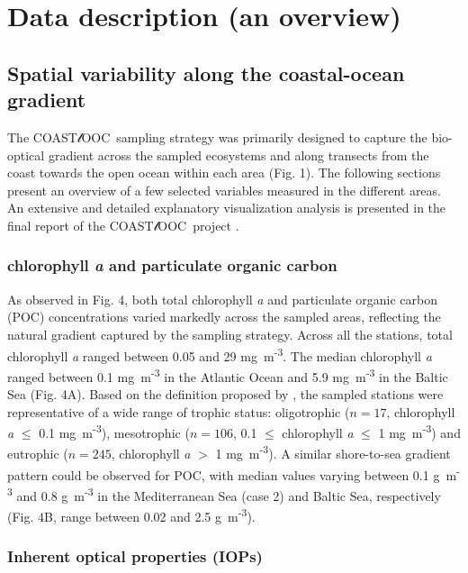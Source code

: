 \documentclass[essd, manuscript]{copernicus}
\newcommand{\coastlooc}{COAST$\mathscr{l}$OOC~\allowbreak}
\begin{document}
\section{Data description (an overview)}

\subsection{Spatial variability along the coastal-ocean gradient}

The \coastlooc sampling strategy was primarily designed to capture the bio-optical gradient across the sampled ecosystems and along transects from the coast towards the open ocean within each area (Fig. 1). The following sections present an overview of a few selected variables measured in the different areas. An extensive and detailed explanatory visualization analysis is presented in the final report of the \coastlooc project \citep{Coastlooc2000}. 

\subsubsection{chlorophyll \textit{a} and particulate organic carbon}

As observed in Fig. 4, both total chlorophyll \textit{a} and particulate organic carbon (POC) concentrations varied markedly across the sampled areas, reflecting the natural gradient captured by the sampling strategy. Across all the stations, total chlorophyll \textit{a} ranged between 0.05 and 29 mg~m\textsuperscript{-3}. The median chlorophyll \textit{a} ranged between 0.1 mg~m\textsuperscript{-3} in the Atlantic Ocean and 5.9 mg~m\textsuperscript{-3} in the Baltic Sea (Fig. 4A). Based on the definition proposed by \citealt{Antoine1996}, the sampled stations were representative of a wide range of trophic status: oligotrophic ($n = 17$, chlorophyll \textit{a} $\le$ 0.1 mg~m\textsuperscript{-3}), mesotrophic ($n = 106$, 0.1 $\le$ chlorophyll \textit{a} $\le$ 1 mg~m\textsuperscript{-3}) and eutrophic ($n = 245$, chlorophyll \textit{a} $>$ 1 mg~m\textsuperscript{-3}). A similar shore-to-sea gradient pattern could be observed for POC, with median values varying between 0.1 g~m\textsuperscript{-3} and 0.8 g~m\textsuperscript{-3} in the Mediterranean Sea (case 2) and Baltic Sea, respectively (Fig. 4B, range between 0.02 and 2.5 g~m\textsuperscript{-3}).

\subsubsection{Inherent optical properties (IOPs)}
\end{document}
